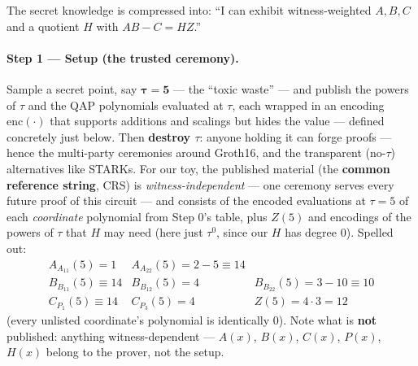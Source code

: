 \documentclass[10pt]{article}
\begin{document}
The secret knowledge is compressed
into: ``I can exhibit witness-weighted $A, B, C$ and a quotient $H$
with $AB - C = HZ$.''

\paragraph{Step 1 --- Setup (the trusted ceremony).} Sample a secret
point, say $\boldsymbol{\tau = 5}$ --- the ``toxic waste'' --- and
publish the powers of $\tau$ and the QAP polynomials evaluated at
$\tau$, each wrapped in an encoding $\mathrm{enc}(\cdot)$ that
supports additions and scalings but hides the value --- defined
concretely just below. Then
\textbf{destroy $\tau$}: anyone holding it can forge proofs ---
hence the multi-party ceremonies around Groth16, and the transparent
(no-$\tau$) alternatives like STARKs. For our toy, the published material (the \textbf{common reference
string}, CRS) is \emph{witness-independent} --- one ceremony serves
every future proof of this circuit --- and consists of the encoded
evaluations at $\tau = 5$ of each \emph{coordinate} polynomial
from Step 0's table, plus $Z(5)$ and encodings of the powers of
$\tau$ that $H$ may need (here just $\tau^0$, since our $H$ has
degree 0). Spelled out:
\[
\begin{array}{lll}
A_{A_{11}}(5) = 1 & A_{A_{22}}(5) = 2-5 \equiv 14 & \\
B_{B_{11}}(5) \equiv 14 & B_{B_{12}}(5) = 4 & B_{B_{22}}(5) = 3-10 \equiv 10\\
C_{P_1}(5) \equiv 14 & C_{P_3}(5) = 4 &
  Z(5) = 4\cdot3 = 12
\end{array}
\]
(every unlisted coordinate's polynomial is identically 0). Note what
is \textbf{not} published: anything witness-dependent --- $A(x)$,
$B(x)$, $C(x)$, $P(x)$, $H(x)$ belong to the prover, not the setup.
\end{document}
